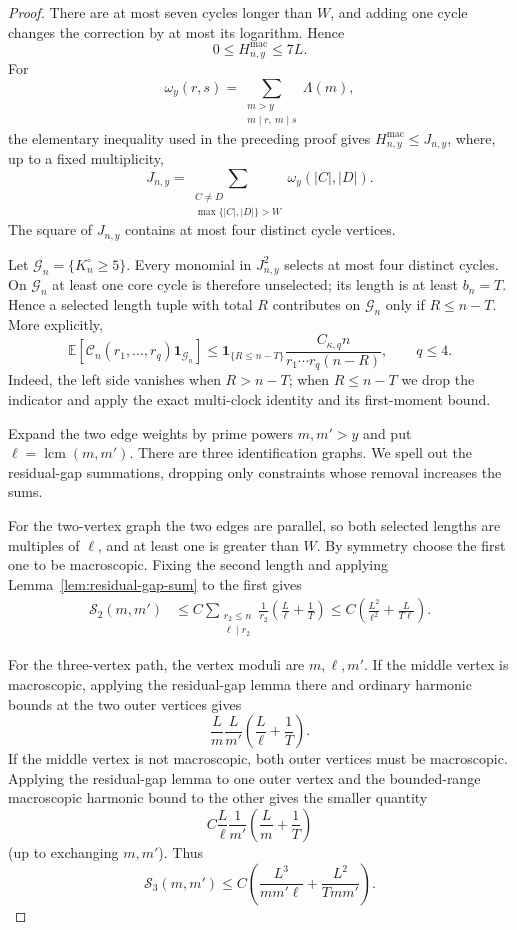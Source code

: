\documentclass[11pt]{article}
\theoremstyle{remark}
\newcommand{\Ee}{\mathbb E}
\newcommand{\one}{\mathbf 1}
\newcommand{\lcm}{\operatorname{lcm}}
\begin{document}
\begin{proof}
There are at most seven cycles longer than $W$, and adding one cycle changes
the correction by at most its logarithm.  Hence
\begin{equation}
\label{eq:Hmac-bounded}
 0\le H_{n,y}^{\mathrm{mac}}\le7L.
\end{equation}
For
\[
 \omega_y(r,s)=\sum_{\substack{m>y\\m\mid r,\ m\mid s}}\Lambda(m),
\]
the elementary inequality used in the preceding proof gives
$H_{n,y}^{\mathrm{mac}}\le J_{n,y}$, where, up to a fixed multiplicity,
\[
 J_{n,y}=\sum_{\substack{C\ne D\\\max\{|C|,|D|\}>W}}
 \omega_y(|C|,|D|).
\]
The square of $J_{n,y}$ contains at most four distinct cycle vertices.

Let $\mathcal G_n=\{K_n^\circ\ge5\}$.  Every monomial in
$J_{n,y}^2$ selects at most four distinct cycles.  On $\mathcal G_n$ at
least one core cycle is therefore unselected; its length is at least
$b_n=T$.  Hence a selected length tuple with total $R$ contributes on
$\mathcal G_n$ only if $R\le n-T$.  More explicitly,
\begin{equation}
\label{eq:macro-indicator-drop}
 \Ee\left[
 \mathcal C_n(r_1,\ldots,r_q)\one_{\mathcal G_n}
 \right]
 \le
 \one_{\{R\le n-T\}}
 \frac{C_{\kappa,q}n}{r_1\cdots r_q(n-R)},
 \qquad q\le4.
\end{equation}
Indeed, the left side vanishes when $R>n-T$; when $R\le n-T$ we drop the
indicator and apply the exact multi-clock identity and its first-moment
bound.

Expand the two edge weights by prime powers $m,m'>y$ and put
$\ell=\lcm(m,m')$.  There are three identification graphs.  We spell out
the residual-gap summations, dropping only constraints whose removal
increases the sums.

For the two-vertex graph the two edges are parallel, so both selected
lengths are multiples of $\ell$, and at least one is greater than $W$.
By symmetry choose the first one to be macroscopic.  Fixing the second
length and applying Lemma~\ref{lem:residual-gap-sum} to the first gives
\begin{align*}
 \mathcal S_2(m,m')
 &\le C\sum_{\substack{r_2\le n\\\ell\mid r_2}}
 \frac1{r_2}
 \left(\frac L\ell+\frac1T\right)
 \le C\left(\frac{L^2}{\ell^2}
 +\frac{L}{T\ell}\right).
\end{align*}

For the three-vertex path, the vertex moduli are $m,\ell,m'$.  If the
middle vertex is macroscopic, applying the residual-gap lemma there and
ordinary harmonic bounds at the two outer vertices gives
\[
 \frac Lm\frac L{m'}
 \left(\frac L\ell+\frac1T\right).
\]
If the middle vertex is not macroscopic, both outer vertices must be
macroscopic.  Applying the residual-gap lemma to one outer vertex and the
bounded-range macroscopic harmonic bound to the other gives the smaller
quantity
\[
 C\frac L\ell\frac1{m'}
 \left(\frac Lm+\frac1T\right)
\]
(up to exchanging $m,m'$).  Thus
\[
 \mathcal S_3(m,m')\le C\left(\frac{L^3}{mm'\ell}
 +\frac{L^2}{Tmm'}\right).
\]


\end{proof}
\end{document}
